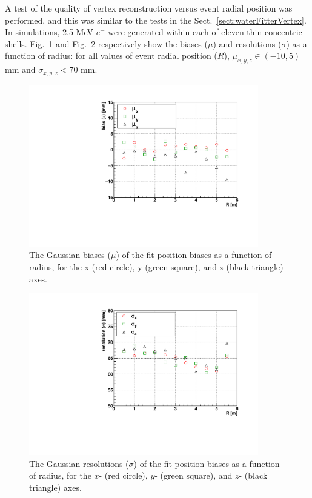 A test of the quality of vertex reconstruction versus event radial position was performed, and this was similar to the tests in the Sect.~\ref{sect:waterFitterVertex}. In simulations, 2.5 MeV $e^-$ were generated within each of eleven thin concentric shells. Fig.~\ref{fig:scintShellVsBias} and Fig.~\ref{fig:scintShellVsResol} respectively show the biases ($\mu$) and resolutions ($\sigma$) as a function of radius: for all values of event radial position ($R$), $\mu_{x,y,z}\in(-10,5)$ mm and $\sigma_{x,y,z} < 70$ mm. 

\begin{figure}[!htb]
	\centering
	\includegraphics[width=10cm]{shellTestScintFitter_RvsBias.pdf}
	\caption[The Gaussian biases ($\mu$) of the \texttt{MP scint fitter} fit position biases as a function of radius, for the x, y, and z axes.]{The Gaussian biases ($\mu$) of the fit position biases as a function of radius, for the x (red circle), y (green square), and z (black triangle) axes.}
	\label{fig:scintShellVsBias}
\end{figure}

\begin{figure}[!htb]
	\centering
	\includegraphics[width=10cm]{shellTestScintFitter_RvsResol.pdf}
	\caption[The Gaussian resolutions ($\sigma$) of the \texttt{MP scint fitter} fit position biases as a function of radius, for the $x,y,z$  axes.]{The Gaussian resolutions ($\sigma$) of the fit position biases as a function of radius, for the $x$- (red circle), $y$- (green square), and $z$- (black triangle) axes.}
	\label{fig:scintShellVsResol}
\end{figure}

